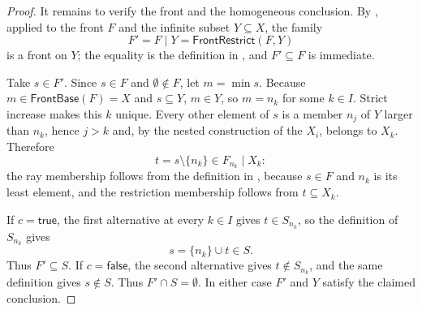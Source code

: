 \begin{proof}
It remains to verify the front and the homogeneous conclusion.  By
, applied to the front $F$ and the infinite
subset $Y\subseteq X$, the family
\[
 F'=F\mathbin{|}Y
   =\mathsf{FrontRestrict}(F,Y)
\]
is a front on $Y$; the equality is the definition in
, and $F'\subseteq F$ is immediate.

Take $s\in F'$.  Since $s\in F$ and $\emptyset\notin F$, let
$m=\min s$.  Because $m\in\mathsf{FrontBase}(F)=X$ and $s\subseteq Y$,
$m\in Y$, so $m=n_k$ for some $k\in I$.  Strict increase makes this $k$
unique.  Every other element of $s$ is a member $n_j$ of $Y$ larger than
$n_k$, hence $j>k$ and, by the nested construction of the $X_i$, belongs
to $X_k$.  Therefore
\[
 t=s\setminus\{n_k\}\in F_{n_k}\mathbin{|}X_k:
\]
the ray membership follows from the definition in , because
$s\in F$ and $n_k$ is its least element, and the restriction membership
follows from $t\subseteq X_k$.

If $c=\mathsf{true}$, the first alternative at every $k\in I$ gives
$t\in S_{n_k}$, so the definition of $S_{n_k}$ gives
\[
 s=\{n_k\}\cup t\in S.
\]
Thus $F'\subseteq S$.  If $c=\mathsf{false}$, the second alternative
gives $t\notin S_{n_k}$, and the same definition gives $s\notin S$.
Thus $F'\cap S=\emptyset$.  In either case $F'$ and $Y$ satisfy the
claimed conclusion.
\end{proof}
